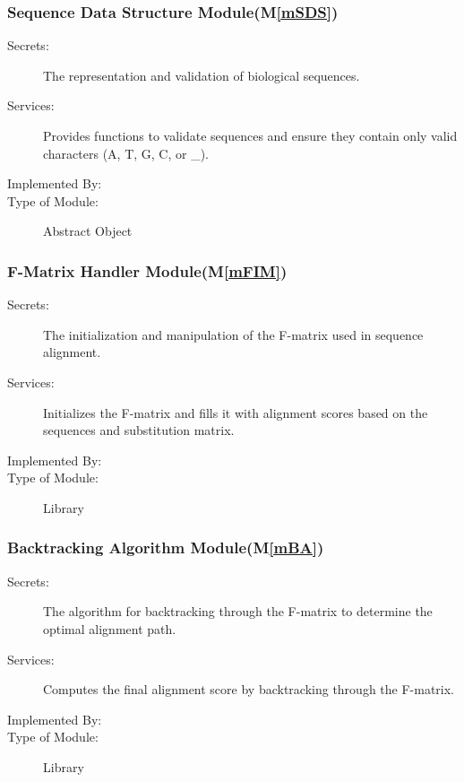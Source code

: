 \documentclass[12pt, titlepage]{article}
\newcommand{\mref}[1]{M\ref{#1}}
\begin{document}
\subsubsection{Sequence Data Structure Module(\mref{mSDS})}
\begin{description}
  \item[Secrets:] The representation and validation of biological sequences.
  \item[Services:] Provides functions to validate sequences and ensure they contain only valid characters (A, T, G, C, or \_).
  \item[Implemented By:] \progname{}
  \item[Type of Module:] Abstract Object
\end{description}


\subsubsection{F-Matrix Handler Module(\mref{mFIM})}
\begin{description}
  \item[Secrets:] The initialization and manipulation of the F-matrix used in sequence alignment.
  \item[Services:] Initializes the F-matrix and fills it with alignment scores based on the sequences and substitution matrix.
  \item[Implemented By:] \progname{}
  \item[Type of Module:] Library
\end{description}


\subsubsection{Backtracking Algorithm Module(\mref{mBA})}
\begin{description}
  \item[Secrets:] The algorithm for backtracking through the F-matrix to determine the optimal alignment path.
  \item[Services:] Computes the final alignment score by backtracking through the F-matrix.
  \item[Implemented By:] \progname{}
  \item[Type of Module:] Library
\end{description}
\end{document}
